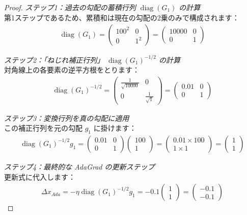 \documentclass[dvipdfmx,a4paper,11pt]{jsarticle}
\begin{document}
\begin{proof}
\textit{ステップ1：過去の勾配の蓄積行列 $\operatorname{diag}(G_1)$ の計算}\\
第1ステップであるため、累積和は現在の勾配の2乗のみで構成されます：
\begin{align*}
    \operatorname{diag}(G_1) = \begin{pmatrix} 100^2 & 0 \\ 0 & 1^2 \end{pmatrix} = \begin{pmatrix} 10000 & 0 \\ 0 & 1 \end{pmatrix}
\end{align*}

\textit{ステップ2：「ねじれ補正行列」 $\operatorname{diag}(G_1)^{-1/2}$ の計算}\\
対角線上の各要素の逆平方根をとります：
\begin{align*}
    \operatorname{diag}(G_1)^{-1/2} = \begin{pmatrix} \frac{1}{\sqrt{10000}} & 0 \\ 0 & \frac{1}{\sqrt{1}} \end{pmatrix} = \begin{pmatrix} 0.01 & 0 \\ 0 & 1 \end{pmatrix}
\end{align*}

\textit{ステップ3：変換行列を真の勾配に適用}\\
この補正行列を元の勾配 $g_1$ に掛けます：
\begin{align*}
    \operatorname{diag}(G_1)^{-1/2} g_1 = \begin{pmatrix} 0.01 & 0 \\ 0 & 1 \end{pmatrix} \begin{pmatrix} 100 \\ 1 \end{pmatrix} = \begin{pmatrix} 0.01 \times 100 \\ 1 \times 1 \end{pmatrix} = \begin{pmatrix} 1 \\ 1 \end{pmatrix}
\end{align*}

\textit{ステップ4：最終的な AdaGrad の更新ステップ}\\
更新式に代入します：
\begin{align*}
    \Delta x_{Ada} = -\eta \operatorname{diag}(G_1)^{-1/2} g_1 = -0.1 \begin{pmatrix} 1 \\ 1 \end{pmatrix} = \begin{pmatrix} -0.1 \\ -0.1 \end{pmatrix}
\end{align*}


\end{proof}
\end{document}
